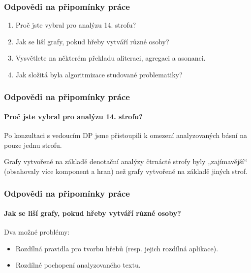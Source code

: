 \documentclass[12pt,xcolor=usenames,dvipsnames]{beamer}
\begin{document}
\begin{frame}
	\frametitle{Odpovědi na připomínky práce}

	\begin{enumerate}
		\item Proč jste vybral pro analýzu 14. strofu?
		\item Jak se liší grafy, pokud hřeby vytváří různé osoby?
		\item Vysvětlete na některém překladu aliteraci, agregaci a asonanci.				
		\item Jak složitá byla algoritmizace studované problematiky?				
	\end{enumerate}
\end{frame}

\begin{frame}
	\frametitle{Odpovědi na připomínky práce}
	\framesubtitle{Proč jste vybral pro analýzu 14. strofu?}

	Po konzultaci s vedoucím DP jsme přistoupili k omezení analyzovaných básní na pouze jednu strofu.
	
	Grafy vytvořené na základě denotační analýzy čtrnácté strofy byly „zajímavější“ (obsahovaly více komponent a hran) než grafy vytvořené na základě jiných strof.
\end{frame}

\begin{frame}
	\frametitle{Odpovědi na připomínky práce}
	\framesubtitle{Jak se liší grafy, pokud hřeby vytváří různé osoby?}

	Dva možné problémy:
	
	\begin{itemize}
		\item Rozdílná pravidla pro tvorbu hřebů (resp. jejich rozdílná aplikace).
		\item Rozdílné pochopení analyzovaného textu.
	\end{itemize}
\end{frame}
\end{document}
